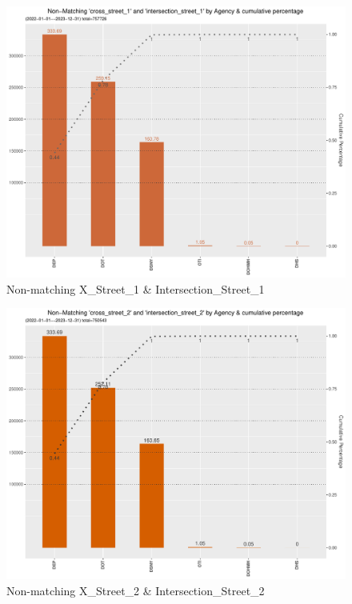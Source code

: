 \documentclass[12pt, titlepage]{article}
\begin{document}
{	\begin{figure}[H]
		 \centering
		 \includegraphics[width = \textwidth]{non-matchingcross_street_1andintersection_street_1.pdf}
		 \caption{Non-matching X\_Street\_1 \& Intersection\_Street\_1}
		 \label{fig:xstreet1}
	\end{figure}	

	\begin{figure}[H]
		 \centering
		 \includegraphics[width = \textwidth]{non-matchingcross_street_2andintersection_street_2.pdf}
		 \caption{Non-matching X\_Street\_2 \& Intersection\_Street\_2}
		 \label{fig:xstreet2}
	\end{figure}	

}
\end{document}
